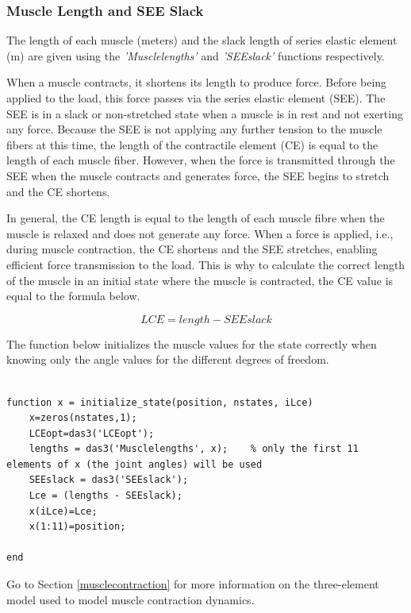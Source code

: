 \subsubsection{Muscle Length and SEE Slack}
The length of each muscle (meters) and the slack length of series elastic element (m) are given using the \textit{'Musclelengths'} and \textit{'SEEslack'} functions respectively. 

When a muscle contracts, it shortens its length to produce force. Before being applied to the load, this force passes via the series elastic element (SEE). The SEE is in a slack or non-stretched state when a muscle is in rest and not exerting any force. Because the SEE is not applying any further tension to the muscle fibers at this time, the length of the contractile element (CE) is equal to the length of each muscle fiber. However, when the force is transmitted through the SEE when the muscle contracts and generates force, the SEE begins to stretch and the CE shortens. 

In general, the CE length is equal to the length of each muscle fibre when the muscle is relaxed and does not generate any force. When a force is applied, i.e., during muscle contraction, the CE shortens and the SEE stretches, enabling efficient force transmission to the load. This is why to calculate the correct length of the muscle in an initial state where the muscle is contracted, the CE value is equal to the formula below.

\begin{equation}
    LCE = length - SEEslack \label{LCE}
\end{equation}

The function below initializes the muscle values for the state correctly when knowing only the angle values for the different degrees of freedom.\newpage

\begin{lstlisting}[style=Matlab-editor]

function x = initialize_state(position, nstates, iLce)
    x=zeros(nstates,1);
    LCEopt=das3('LCEopt');
    lengths = das3('Musclelengths', x);    % only the first 11 elements of x (the joint angles) will be used
    SEEslack = das3('SEEslack');
    Lce = (lengths - SEEslack);
    x(iLce)=Lce;
    x(1:11)=position;

end
\end{lstlisting}

Go to Section \ref{musclecontraction} for more information on the three-element model used to model muscle contraction dynamics. \newline

